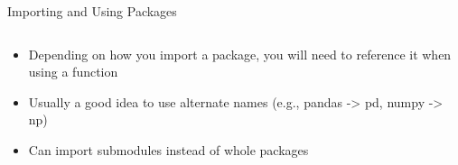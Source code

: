 \documentclass[10pt, aspectratio=169]{beamer}
\begin{document}
{\begin{frame}{Importing and Using Packages}
  \begin{columns}
\begin{column}{0.5\textwidth}
    \begin{itemize}
        \item Depending on how you import a package, you will need to reference it when using a function
        \item Usually a good idea to use alternate names (e.g., pandas -> pd, numpy -> np)
        \item Can import submodules instead of whole packages
    \end{itemize}
\end{column}
\end{columns}
\end{frame}}
\end{document}
